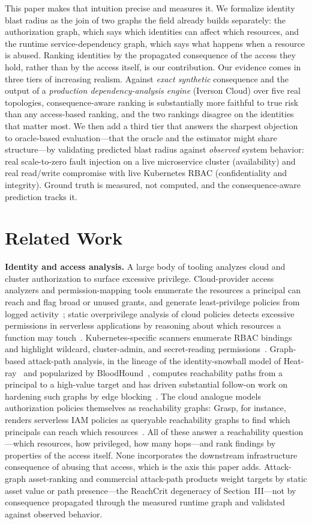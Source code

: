 \documentclass[conference]{IEEEtran}
\begin{document}
This paper makes that intuition precise and measures it. We formalize identity
blast radius as the join of two graphs the field already builds separately: the
authorization graph, which says which identities can affect which resources, and
the runtime service-dependency graph, which says what happens when a resource is
abused. Ranking identities by the propagated consequence of the access they hold,
rather than by the access itself, is our contribution. Our evidence comes in three
tiers of increasing realism. Against \emph{exact synthetic} consequence and the
output of a \emph{production dependency-analysis engine} (Iverson Cloud) over five
real topologies, consequence-aware ranking is substantially more faithful to true
risk than any access-based ranking, and the two rankings disagree on the identities
that matter most. We then add a third tier that answers the sharpest objection to
oracle-based evaluation---that the oracle and the estimator might share
structure---by validating predicted blast radius against \emph{observed} system
behavior: real scale-to-zero fault injection on a live microservice cluster
(availability) and real read/write compromise with live Kubernetes RBAC
(confidentiality and integrity). Ground truth is measured, not computed, and the
consequence-aware prediction tracks it.

\section{Related Work}
\textbf{Identity and access analysis.} A large body of tooling analyzes cloud and
cluster authorization to surface excessive privilege. Cloud-provider access
analyzers and permission-mapping tools enumerate the resources a principal can
reach and flag broad or unused grants, and generate least-privilege policies from
logged activity~\cite{awsiam}; static overprivilege analysis of cloud policies
detects excessive permissions in serverless applications by reasoning about which
resources a function may touch~\cite{overpriv}. Kubernetes-specific scanners
enumerate RBAC bindings and highlight wildcard, cluster-admin, and secret-reading
permissions~\cite{kubiscan}. Graph-based attack-path analysis, in the lineage of
the identity-snowball model of Heat-ray~\cite{heatray} and popularized by
BloodHound~\cite{bloodhound}, computes reachability paths from a principal to a
high-value target and has driven substantial follow-on work on hardening such
graphs by edge blocking~\cite{gecco}. The cloud analogue models authorization
policies themselves as reachability graphs: Grasp, for instance, renders serverless
IAM policies as queryable reachability graphs to find which principals can reach
which resources~\cite{grasp}. All of these answer a reachability question---which
resources, how privileged, how many hops---and rank findings by properties of the
access itself. None incorporates the downstream infrastructure consequence of
abusing that access, which is the axis this paper adds. Attack-graph asset-ranking and commercial
attack-path products weight targets by static asset value or path presence---the
ReachCrit degeneracy of Section~III---not by consequence propagated through the
measured runtime graph and validated against observed behavior.
\end{document}
